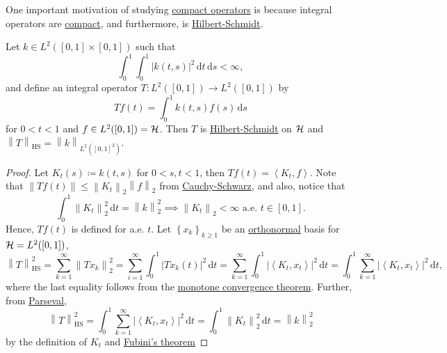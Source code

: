 One important motivation of studying \hyperref[def:compact-op]{compact operators} is because integral operators are \hyperref[def:compact-op]{compact}, and furthermore, is \hyperref[def:Hilbert-Schmidt-op]{Hilbert-Schmidt}.
\begin{proposition}\label{prop:Hilbert-Schmidt-integral-op}
	Let \(k\in L^2([0, 1]\times [0, 1])\) such that
	\[
		\int _0^1 \int _0^1 \left\vert k(t, s) \right\vert ^{2} \,\mathrm{d} t\,\mathrm{d} s < \infty,
	\]
	and define an integral operator \(T\colon L^2([0, 1])\to L^2([0, 1])\) by
	\[
		Tf(t) = \int _0^1 k(t, s)f(s)\,\mathrm{d} s
	\]
	for \(0 < t < 1\) and \(f\in L^2([0, 1])= \mathcal{\MakeUppercase{h}} \). Then \(T\) is \hyperref[def:Hilbert-Schmidt-op]{Hilbert-Schmidt} on \(\mathcal{\MakeUppercase{h}} \) and \(\left\lVert T\right\rVert _{\mathrm{HS} }= \left\lVert k\right\rVert _{L^2([0, 1]^2)}\).
\end{proposition}
\begin{proof}
	Let \(K_t(s) \coloneqq k(t, s)\) for \(0<s, t<1\), then \(Tf(t) = \left\langle K_t, f \right\rangle \). Note that \(\left\lVert Tf(t)\right\rVert \leq \left\lVert K_t\right\rVert _2 \left\lVert f\right\rVert _2\) from \hyperref[thm:Cauchy-Schwarz-ineq]{Cauchy-Schwarz}, and also, notice that
	\[
		\int_{0}^{1} \left\lVert K_t\right\rVert ^2_2 \,\mathrm{d}t = \left\lVert k\right\rVert _2^2 \implies \left\lVert K_t\right\rVert _2<\infty \text{ a.e. }t\in [0,1].
	\]
	Hence, \(Tf(t)\) is defined for a.e. \(t\). Let \(\left\{ x_k \right\} _{k \geq 1}\) be an \hyperref[def:orthonormal-system]{orthonormal} basis for \(\mathcal{\MakeUppercase{h}} =L^2([0, 1])\),
	\[
		\left\lVert T\right\rVert ^2 _{\mathrm{HS} }
		= \sum_{k=1}^{\infty} \left\lVert T x_{k} \right\rVert _2^2
		= \sum_{i=1}^{\infty} \int _0^1 \left\vert T x_{k} (t) \right\vert ^2 \,\mathrm{d} t
		= \sum_{k=1}^{\infty} \int _0^1 \left\vert \left\langle K_{t} , x_{t}  \right\rangle  \right\vert ^2 \,\mathrm{d} t
		= \int _0^1 \sum_{k=1}^{\infty}\left\vert \left\langle K_{t} , x_{t}  \right\rangle  \right\vert ^2 \,\mathrm{d} t ,
	\]
	where the last equality follows from the \href{https://en.wikipedia.org/wiki/Monotone_convergence_theorem}{monotone convergence theorem}. Further, from \hyperref[col:Parseval]{Parseval},
	\[
		\left\lVert T\right\rVert ^2 _{\mathrm{HS} }
		= \int _0^1 \sum_{k=1}^{\infty}\left\vert \left\langle K_{t} , x_{t}  \right\rangle  \right\vert ^2 \,\mathrm{d} t
		= \int _0^1 \left\lVert K_t\right\rVert _2^2 \,\mathrm{d} t
		= \left\lVert k\right\rVert _2^2
	\]
	by the definition of \(K_t\) and \href{https://en.wikipedia.org/wiki/Fubini's_theorem}{Fubini's theorem}
\end{proof}

